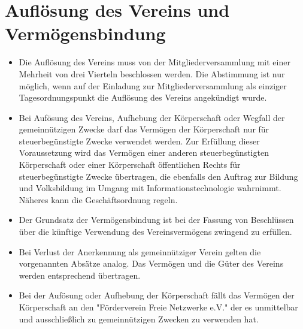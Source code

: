\documentclass[a4paper,10pt]{article}
\begin{document}
\section{Auflösung des Vereins und Vermögensbindung}
  \begin{itemize}
   \item Die Auflösung des Vereins muss von der Mitgliederversammlung mit einer Mehrheit von drei Vierteln beschlossen werden. Die Abstimmung ist nur möglich, wenn auf der Einladung zur Mitgliederversammlung als einziger Tagesordnungspunkt die Auflösung des Vereins angekündigt wurde.
   \item Bei Aufösung des Vereins, Aufhebung der Körperschaft oder Wegfall der gemeinnützigen Zwecke darf das Vermögen der Körperschaft nur für steuerbegünstigte Zwecke verwendet werden. Zur Erfüllung dieser Voraussetzung wird das Vermögen einer anderen steuerbegünstigten Körperschaft oder einer Körperschaft öffentlichen Rechts für steuerbegünstigte Zwecke übertragen, die ebenfalls den Auftrag zur Bildung und Volksbildung im Umgang mit Informationstechnologie wahrnimmt. Näheres kann die Geschäftsordnung regeln.
   \item Der Grundsatz der Vermögensbindung ist bei der Fassung von Beschlüssen über die künftige Verwendung des Vereinsvermögens zwingend zu erfüllen.
   \item Bei Verlust der Anerkennung als gemeinnütziger Verein gelten die vorgenannten Absätze analog. Das Vermögen und die Güter des Vereins werden entsprechend übertragen.
   \item Bei der Aufösung oder Aufhebung der Körperschaft fällt das Vermögen der Körperschaft an den "Förderverein Freie Netzwerke e.V." der es unmittelbar und ausschließlich zu gemeinnützigen Zwecken zu verwenden hat.
  \end{itemize}
\end{document}
